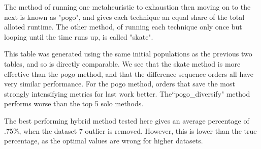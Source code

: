 \documentclass[11pt, letterpaper, onecolumn]{article}
\begin{document}
The method of running one metaheuristic to exhaustion then moving on to the next is known as "pogo", and gives each technique an equal share of the total alloted runtime. The other method, of running each technique only once but looping until the time runs up, is called "skate". 

\begin{table}[htbp] 
\end{table}

This table was generated using the same initial populations as the previous two tables, and so is directly comparable. We see that the skate method is more effective than the pogo method, and that the difference sequence orders all have very similar performance. For the pogo method, orders that save the most strongly intensifying metrics for last work better. The``pogo\_diversify" method performs worse than the top 5 solo methods. 

The best performing hybrid method tested here gives an average percentage of .75\%, when the dataset 7 outlier is removed. However, this is lower than the true percentage, as the optimal values are wrong for higher datasets. 



\end{document}

